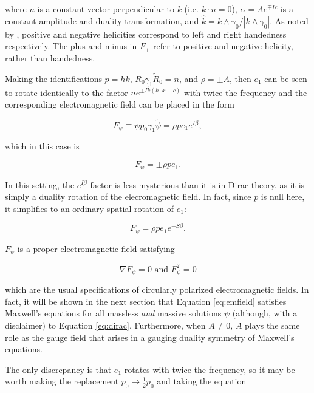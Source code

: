 \documentclass{article}
\begin{document}
    where $n$ is a constant vector perpendicular to $k$ (i.e. $k \cdot n= 0$), $\alpha = A e^{\mp I c}$ is a constant amplitude and duality transformation, and $\hat k = k \wedge \gamma_0 / |k \wedge \gamma_0|$. As noted by \cite{gap}, positive and negative helicities correspond to left and right handedness respectively. The plus and minus in $F_\pm$ refer to positive and negative helicity, rather than handedness.

    Making the identifications $p = \hbar k$, $R_0 \gamma_1 \widetilde R_0 = n$, and $\rho = \pm A$, then $e_1$ can be seen to rotate identically to the factor $n e^{\pm I \hat k (k \cdot x + c)}$ with twice the frequency and the corresponding electromagnetic field can be placed in the form

    \begin{equation}
      F_\psi \equiv \psi p_0 \gamma_1 \widetilde \psi = \rho p e_1 e^{I \beta}, \label{eq:emfield}
    \end{equation}

    which in this case is

    \begin{equation}
      F_\psi = \pm \rho p e_1.
    \end{equation}

    In this setting, the $e^{I \beta}$ factor is less mysterious than it is in Dirac theory, as it is simply a duality rotation of the elecromagnetic field. In fact, since $p$ is null here, it simplifies to an ordinary spatial rotation of $e_1$:

    \begin{equation}
      F_\psi = \rho p e_1 e^{-S \beta}.
    \end{equation}

    $F_\psi$ is a proper electromagnetic field satisfying

    \begin{equation}
      \nabla F_\psi = 0 \text { and } F_\psi^2 = 0
    \end{equation}

    which are the usual specifications of circularly polarized electromagnetic fields. In fact, it will be shown in the next section that Equation \ref{eq:emfield} satisfies Maxwell's equations for all massless \emph{and} massive solutions $\psi$ (although, with a disclaimer) to Equation \ref{eq:dirac}. Furthermore, when $A \not= 0$, $A$ plays the same role as the gauge field that arises in a gauging duality symmetry of Maxwell's equations.

    The only discrepancy is that $e_1$ rotates with twice the frequency, so it may be worth making the replacement $p_0 \mapsto \frac{1}{2} p_0$ and taking the equation
\end{document}
